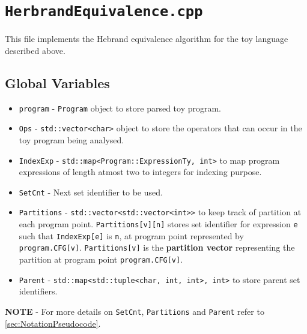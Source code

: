 \section{\texttt{HerbrandEquivalence.cpp}}
\label{sec:HerbrandEquivalenceCpp}
This file implements the Hebrand equivalence algorithm for the toy language  
described above.

\subsection{Global Variables}
\label{subsec:GlobalVariablesHerbrandEquivaleceCpp}
\begin{itemize} \tightlist
    \item \texttt{program} - \texttt{Program} object to store parsed toy program.
    \item \texttt{Ops} - \texttt{std::vector<char>} object to store the operators that can occur in the toy program being analysed.
    \item \texttt{IndexExp} - \texttt{std::map<Program::ExpressionTy, int>} to map program expressions of length atmost two to integers for indexing purpose.
    \item \texttt{SetCnt} - Next set identifier to be used.
    \item \texttt{Partitions} - \texttt{std::vector<std::vector<int>>} to keep track of partition at each program point. \texttt{Partitions[v][n]} stores set identifier for expression \texttt{e} such that \texttt{IndexExp[e]} is \texttt{n}, at program point represented by \texttt{program.CFG[v]}. \texttt{Partitions[v]} is the \textbf{partition vector} representing the partition at program point \texttt{program.CFG[v]}.
    \item \texttt{Parent} - \texttt{std::map<std::tuple<char, int, int>, int>} to store parent set identifiers.
\end{itemize}
\textbf{NOTE} - For more details on \texttt{SetCnt}, \texttt{Partitions} and \texttt{Parent} refer to \autoref{sec:NotationPseudocode}.

